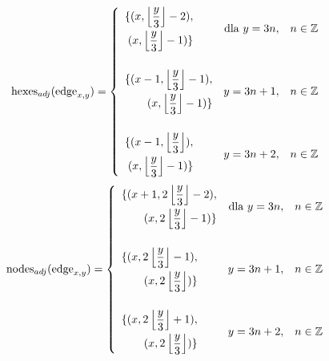 \documentclass[a4paper,12pt]{article}
\begin{document}
\begin{equation}
  \text{hexes}_{adj}(\text{edge}_{x,y})=
  \left\{
    \begin{array}{l r l}
      \begin{aligned}
        \{
        (x, \left\lfloor\frac{y}{3}\right\rfloor-2), \\
        (x, \left\lfloor\frac{y}{3}\right\rfloor-1)
        \}
      \end{aligned} & \mbox{dla } y=3n, & n\in\mathbb{Z} \\[30pt]
      \begin{aligned}
        \{
        (x-1, \left\lfloor\frac{y}{3}\right\rfloor-1), \\
        (x, \left\lfloor\frac{y}{3}\right\rfloor-1)
        \}
      \end{aligned} & y=3n+1, & n\in\mathbb{Z} \\[30pt]
      \begin{aligned}
      \{
      (x-1, \left\lfloor\frac{y}{3}\right\rfloor), \\
      (x, \left\lfloor\frac{y}{3}\right\rfloor-1)
      \}
      \end{aligned} & y=3n+2, & n\in\mathbb{Z} \\
    \end{array} \right.
  \label{edgehexes}
\end{equation}
\begin{equation}
  \text{nodes}_{adj}(\text{edge}_{x,y})=
  \left\{
    \begin{array}{l r l}
      \begin{aligned}
      \{
      (x+1, 2\left\lfloor\frac{y}{3}\right\rfloor-2), \\
      (x, 2\left\lfloor\frac{y}{3}\right\rfloor-1)
      \}
      \end{aligned} & \mbox{dla } y=3n, & n\in\mathbb{Z} \\[30pt]
      \begin{aligned}
        \{
        (x, 2\left\lfloor\frac{y}{3}\right\rfloor-1), \\
        (x, 2\left\lfloor\frac{y}{3}\right\rfloor)
        \}
      \end{aligned} & y=3n+1, & n\in\mathbb{Z} \\[30pt]
      \begin{aligned}
      \{
      (x, 2\left\lfloor\frac{y}{3}\right\rfloor+1), \\
      (x, 2\left\lfloor\frac{y}{3}\right\rfloor)
      \}
      \end{aligned} & y=3n+2, & n\in\mathbb{Z} \\
    \end{array} \right.
  \label{edgenodes}
\end{equation}
\end{document}
